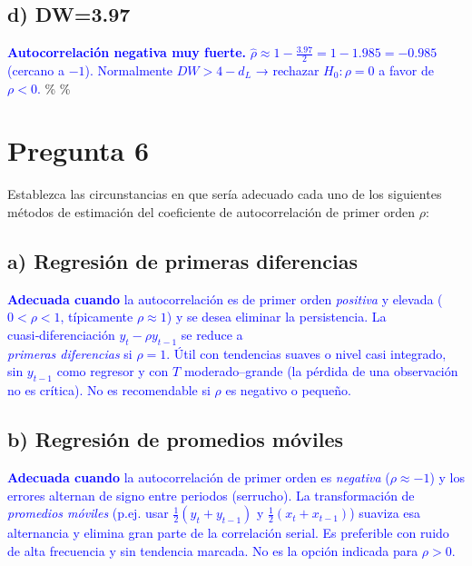 \documentclass[10pt]{article}
\begin{document}
\subsection{d) DW=3.97}
\textcolor{blue}{
\textbf{Autocorrelación negativa muy fuerte.} $\hat\rho\approx1-\tfrac{3.97}{2}=1-1.985=-0.985$ (cercano a $-1$). Normalmente $DW>4-d_L$ → rechazar $H_0:\rho=0$ a favor de $\rho<0$.
}
\%%
\%%
\section{Pregunta 6}
Establezca las circunstancias en que sería adecuado cada uno de los siguientes métodos de estimación del coeficiente de autocorrelación de primer orden $\rho$:

\subsection{a) Regresión de primeras diferencias}
\textcolor{blue}{
\textbf{Adecuada cuando} la autocorrelación es de primer orden \emph{positiva} y elevada ($0<\rho<1$, típicamente $\rho\approx1$) y se desea eliminar la persistencia. La cuasi‑diferenciación $y_t-\rho y_{t-1}$ se reduce a \\ \emph{primeras diferencias} si $\rho=1$. Útil con tendencias suaves o nivel casi integrado, sin $y_{t-1}$ como regresor y con $T$ moderado–grande (la pérdida de una observación no es crítica). No es recomendable si $\rho$ es negativo o pequeño.
}

\subsection{b) Regresión de promedios móviles}
\textcolor{blue}{
\textbf{Adecuada cuando} la autocorrelación de primer orden es \emph{negativa} (\(\rho\approx-1\)) y los errores alternan de signo entre periodos (serrucho). La transformación de \emph{promedios móviles} (p.ej. usar $\tfrac{1}{2}(y_t+y_{t-1})$ y $\tfrac{1}{2}(x_t+x_{t-1})$) suaviza esa alternancia y elimina gran parte de la correlación serial. Es preferible con ruido de alta frecuencia y sin tendencia marcada. No es la opción indicada para $\rho>0$.
}
\end{document}
